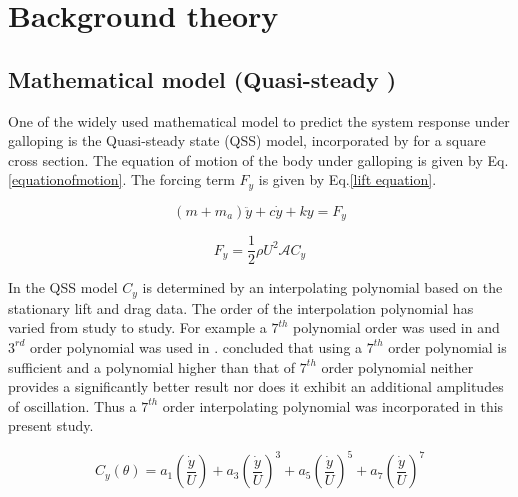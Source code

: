 
\section{Background theory}

\subsection{Mathematical model (Quasi-steady )}

 One of the widely used mathematical model to predict the system response under galloping is the Quasi-steady state (QSS) model, incorporated by \cite{Parkinson1964} for a square cross section. The equation of motion of the body under galloping is given by Eq. \eqref{equationofmotion}. The forcing term $F_y$ is given by Eq.\eqref{lift equation}.
 
 

\begin{equation}
\label{equationofmotion}
(m+m_a)\ddot{y}+c\dot{y}+ky=F_y
\end{equation}

\begin{equation}
\label{lift equation}
F_y=\frac{1}{2}\rho U^2\mathcal{A}C_y
\end{equation}

 In the QSS  model $C_y$ is determined by an interpolating polynomial based on the stationary lift and drag data. The order of the interpolation polynomial has varied from study to study. For  example a $7^{th}$ polynomial order was used in \cite{Parkinson1964} and $3^{rd}$ order polynomial was used in \cite{Barrero-Gil2009}. \cite{Ng2005} concluded that using a $7^{th}$ order polynomial is sufficient and a polynomial higher than that of $7^{th}$ order polynomial neither provides a significantly better result nor does it exhibit an additional amplitudes of oscillation. Thus a $7 ^{th}$ order interpolating polynomial was incorporated in this present study. 

\begin{equation}
\label{cy ploynomial}
C_y(\theta)=a_1\left(\frac{\dot{y}}{U}\right)+a_3\left(\frac{\dot{y}}{U}\right)^3+a_5\left(\frac{\dot{y}}{U}\right)^5+a_7\left(\frac{\dot{y}}{U}\right)^7
\end{equation}


